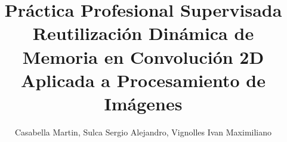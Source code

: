 \documentclass[]{IEEEphot}
\begin{document}
\title{Práctica Profesional Supervisada\\
\LARGE{Reutilización Dinámica de Memoria en Convolución 2D Aplicada a Procesamiento de Imágenes}}

\author{Casabella Martin, Sulca Sergio Alejandro, Vignolles Ivan Maximiliano}


\maketitle


\vspace{-40pt}
\begin{receivedinfo}%
\end{receivedinfo}

\end{document}
